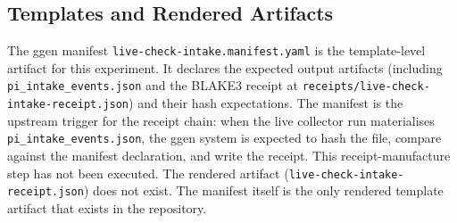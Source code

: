 \subsection{Templates and Rendered Artifacts}
\label{sec:otel-weaver-exp-005-collector-to-intake-implementation-templates}

The ggen manifest \texttt{live-check-intake.manifest.yaml} is the template-level artifact for
this experiment. It declares the expected output artifacts (including
\texttt{pi\_intake\_events.json} and the BLAKE3 receipt at
\texttt{receipts/live-check-intake-receipt.json}) and their hash expectations. The manifest
is the upstream trigger for the receipt chain: when the live collector run materialises
\texttt{pi\_intake\_events.json}, the ggen system is expected to hash the file, compare
against the manifest declaration, and write the receipt. This receipt-manufacture step has
not been executed. The rendered artifact (\texttt{live-check-intake-receipt.json}) does not
exist. The manifest itself is the only rendered template artifact that exists in the
repository.
